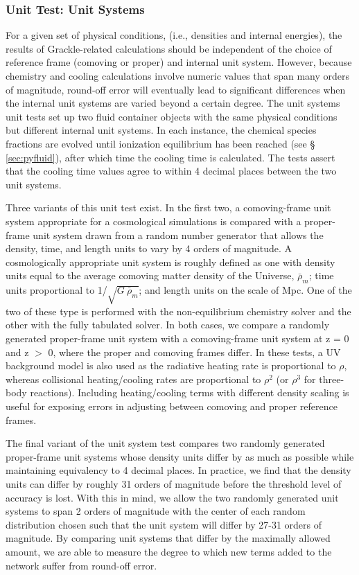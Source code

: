 \subsubsection{Unit Test: Unit Systems}
\label{sec:unit-test}

For a given set of physical conditions, (i.e., densities and internal
energies), the results of Grackle-related calculations should be
independent of the choice of reference frame (comoving or proper) and
internal unit system.  However, because chemistry and cooling
calculations involve numeric values that span many orders of
magnitude, round-off error will eventually lead to significant
differences when the internal unit systems are varied beyond a certain
degree.  The unit systems unit tests set up two fluid container
objects with the same physical conditions but different internal unit
systems.  In each instance, the chemical species fractions are evolved
until ionization equilibrium has been reached (see \S
\ref{sec:pyfluid}), after which time the cooling time is calculated.
The tests assert that the cooling time values agree to within 4
decimal places between the two unit systems.

Three variants of this unit test exist.  In the first two, a
comoving-frame unit system appropriate for a cosmological simulations
is compared with a proper-frame unit system drawn from a random number
generator that allows the density, time, and length units to vary by 4
orders of magnitude.  A cosmologically appropriate unit system is
roughly defined as one with density units equal to the average
comoving matter density of the Universe, $\bar{\rho}_{m}$; time units
proportional to 1/$\sqrt{G\ \bar{\rho}_{m}}$; and length units on the
scale of Mpc.  One of the two of these type is performed with the
non-equilibrium chemistry solver and the other with the fully
tabulated solver.  In both cases, we compare a randomly generated
proper-frame unit system with a comoving-frame unit system at z = 0
and z $>$ 0, where the proper and comoving frames differ.  In these
tests, a UV background model is also used as the radiative heating
rate is proportional to $\rho$, whereas collisional heating/cooling
rates are proportional to $\rho^{2}$ (or $\rho^{3}$ for three-body
reactions).  Including heating/cooling terms with different density
scaling is useful for exposing errors in adjusting between comoving
and proper reference frames.

The final variant of the unit system test compares two randomly
generated proper-frame unit systems whose density units differ by as
much as possible while maintaining equivalency to 4 decimal places.
In practice, we find that the density units can differ by roughly 31
orders of magnitude before the threshold level of accuracy is lost.
With this in mind, we allow the two randomly generated unit systems to
span 2 orders of magnitude with the center of each random distribution
chosen such that the unit system will differ by 27-31 orders of
magnitude.  By comparing unit systems that differ by the maximally
allowed amount, we are able to measure the degree to which new terms
added to the network suffer from round-off error.

